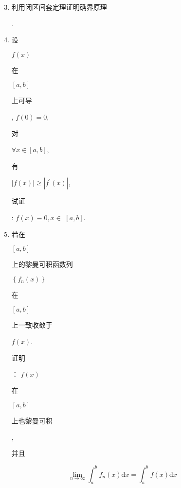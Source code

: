\documentclass[10pt]{article}
\begin{document}
\begin{enumerate}
  \setcounter{enumi}{2}
  \item \begin{CJK}{UTF8}{mj}利用闭区间套定理证明确界原理\end{CJK}.

  \item \begin{CJK}{UTF8}{mj}设\end{CJK} $f(x)$ \begin{CJK}{UTF8}{mj}在\end{CJK} $[a, b]$ \begin{CJK}{UTF8}{mj}上可导\end{CJK}, $f(0)=0$, \begin{CJK}{UTF8}{mj}对\end{CJK} $\forall x \in[a, b]$, \begin{CJK}{UTF8}{mj}有\end{CJK} $|f(x)| \geq\left|f^{\prime}(x)\right|$, \begin{CJK}{UTF8}{mj}试证\end{CJK}: $f(x) \equiv 0, x \in$ $[a, b]$.

  \item \begin{CJK}{UTF8}{mj}若在\end{CJK} $[a, b]$ \begin{CJK}{UTF8}{mj}上的黎曼可积函数列\end{CJK} $\left\{f_{n}(x)\right\}$ \begin{CJK}{UTF8}{mj}在\end{CJK} $[a, b]$ \begin{CJK}{UTF8}{mj}上一致收敛于\end{CJK} $f(x)$. \begin{CJK}{UTF8}{mj}证明\end{CJK}： $f(x)$ \begin{CJK}{UTF8}{mj}在\end{CJK} $[a, b]$ \begin{CJK}{UTF8}{mj}上也黎曼可积\end{CJK}, \begin{CJK}{UTF8}{mj}并且\end{CJK}

\end{enumerate}
$$
\lim _{n \rightarrow \infty} \int_{a}^{b} f_{n}(x) \mathrm{d} x=\int_{a}^{b} f(x) \mathrm{d} x
$$
\end{document}
